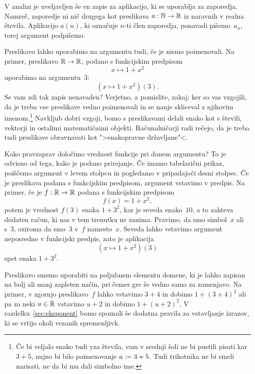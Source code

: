 V analizi je uveljavljen še en zapis za aplikacijo, ki se uporablja za zaporedja. Namreč,
zaporedje ni nič drugega kot preslikava $a : \mathbb{N} \to \mathbb{R}$ iz naravnih v realna števila.
Aplikacijo $a(n)$, ki označuje $n$-ti člen zaporedja, ponavadi pišemo~$a_n$, torej
argument podpišemo.

Preslikavo lahko uporabimo na argumentu tudi, če je nismo poimenovali. Na primer,
preslikavo $\mathbb{R} \to \mathbb{R}$, podano s funkcijskim predpisom
%
\begin{equation*}
  x \mapsto 1 + x^2
\end{equation*}
%
uporabimo na argumentu~$3$:
%
\begin{equation*}
  (x \mapsto 1 + x^2)(3).
\end{equation*}
%
Se vam zdi tak zapis nenavaden? Verjetno, a pomislite, zakaj: ker so vas vzgojili, da
je treba vse preslikave vedno poimenovali in se nanje skliceval z njihovim imenom.\footnote{Če bi veljalo enako tudi yza števila, vam v srednji šoli ne bi pustili pisati kar $3 + 5$, nujno bi bilo poimenovanje $a \mathrel{{:}{=}} 3 + 5$. Tudi trikotnika ne bi smeli narisati, ne da bi mu dali simbolno ime.}
%
Navkljub dobri vzgoji, bomo s preslikavami delali enako kot s števili, vektorji in
ostalimi matematičnimi objekti. Računalničarji radi rečejo, da
je treba tudi preslikave obravnavati kot ">enakopravne državljane"<.

Kako pravzaprav določimo vrednost funkcije pri danem argumentu? To je odvisno od tega,
kako je podano prirejanje. Če imamo tabelarični prikaz, poiščemo argument v levem stolpcu
in pogledamo v pripadajoči desni stolpec. Če je preslikava podana s funkcijskim predpisom, argument
vstavimo v predpis. Na primer, če je $f : \mathbb{R} \to \mathbb{R}$ podana s funkcijskim predpisom
%
\begin{equation*}
  f(x) = 1 + x^2,
\end{equation*}
%
potem je vrednost $f(3)$ enaka $1 + 3^2$, kar je seveda enako~$10$, a to zahteva dodaten
račun, ki nas v tem trenutku ne zanima. Pravimo, da smo simbol~$x$  ali
 s~$3$, oziroma da smo~$3$  v~$f$ namesto~$x$. Seveda lahko
vstavimo argument neposredno v funkcijski predpis, zato je aplikacija
%
\begin{equation*}
  (x \mapsto 1 + x^2)(3)
\end{equation*}
%
spet enaka $1 + 3^2$.

Preslikavo smemo uporabiti na poljubnem elementu domene, ki je lahko zapisan na bolj ali
manj zapleten način, pri čemer gre še vedno samo za zamenjavo. Na primer, v zgornjo
preslikavo~$f$ lahko vstavimo $3 + 4$ in dobimo $1 + (3 + 4)^2$ ali pa za neki $u \in \mathbb{R}$
vstavimo $u + 2$ in dobimo $1 + (u + 2)^2$. V razdelku~\ref{sec:eksponent} bomo spoznali
še dodatna pravila za vstavljanje izrazov, ki se vrtijo okoli vezanih spremenljivk.


